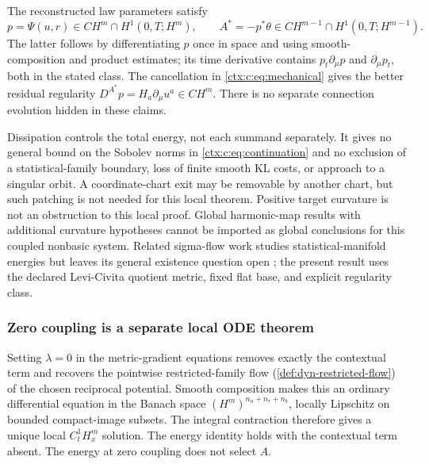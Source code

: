 The reconstructed law parameters satisfy
\begin{equation}
 p=\Psi(u,r)\in CH^m\cap H^1(0,T;H^m),\qquad
 A^*=-p^*\theta\in CH^{m-1}\cap H^1(0,T;H^{m-1}).
 \label{ctx:c:eq:reconstruction}
\end{equation}
The latter follows by differentiating $p$ once in space and using smooth-composition and product estimates; its time derivative contains $p_t\partial_\mu p$ and $\partial_\mu p_t$, both in the stated class. The cancellation in \cref{ctx:c:eq:mechanical} gives the better residual regularity
$D^{A^*}p=H_a\partial_\mu u^a\in CH^m$.
There is no separate connection evolution hidden in these claims.

Dissipation controls the total energy, not each summand separately. It gives no general bound on the Sobolev norms in \cref{ctx:c:eq:continuation} and no exclusion of a statistical-family boundary, loss of finite smooth KL costs, or approach to a singular orbit. A coordinate-chart exit may be removable by another chart, but such patching is not needed for this local theorem. Positive target curvature is not an obstruction to this local proof. Global harmonic-map results with additional curvature hypotheses \cite{EellsSampson1964} cannot be imported as global conclusions for this coupled nonbasic system. Related sigma-flow work studies statistical-manifold energies but leaves its general existence question open \cite{CasselEtAl2024}; the present result uses the declared Levi-Civita quotient metric, fixed flat base, and explicit regularity class.

\subsubsection{Zero coupling is a separate local ODE theorem}

Setting $\lambda=0$ in the metric-gradient equations removes exactly the contextual term and recovers the pointwise restricted-family flow (\cref{def:dyn-restricted-flow}) of the chosen reciprocal potential. Smooth composition makes this an ordinary differential equation in the Banach space $(H^m)^{n_u+n_r+n_b}$, locally Lipschitz on bounded compact-image subsets. The integral contraction therefore gives a unique local $C^1_tH^m_x$ solution. The energy identity holds with the contextual term absent. The energy at zero coupling does not select $A$.

